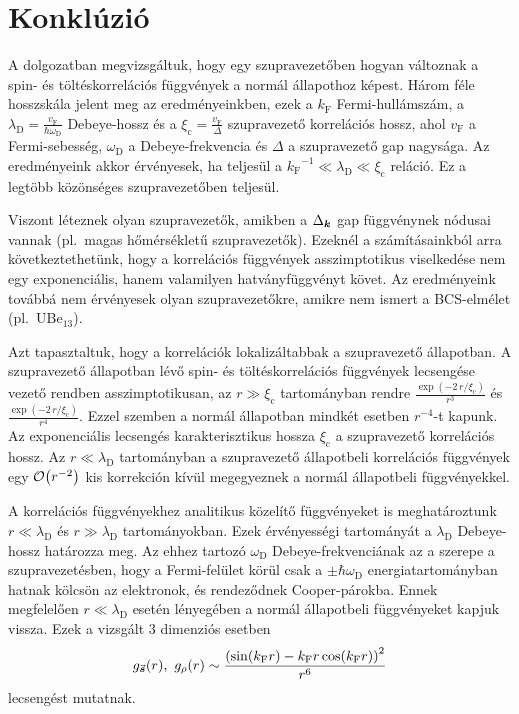 \documentclass[a4paper,12pt,titlepage]{article}
\newcommand{\KK}{{\vb*{k}}}
\newcommand{\kF}{{k_\text{F}}}
\newcommand{\vF}{{v_\text{F}}}
\begin{document}
\section{Konklúzió}

A dolgozatban megvizsgáltuk, hogy egy szupravezetőben hogyan változnak a spin- és töltéskorrelációs függvények a normál állapothoz képest.  Három féle hosszskála jelent meg az eredményeinkben, ezek a $\kF$ Fermi-hullámszám, a $\lambda_\text{D} = \frac{\vF}{\hbar \omega_\text{D}}$ Debeye-hossz és a $\xi_\text{c} = \frac{\vF}{\Delta}$ szupravezető korrelációs hossz, ahol $\vF$ a Fermi-sebesség, $\omega_\text{D}$ a Debeye-frekvencia és $\Delta$ a szupravezető gap nagysága.  Az eredményeink akkor érvényesek, ha teljesül a $\kF^{-1} \ll \lambda_\text{D} \ll \xi_\text{c}$ reláció.  Ez a legtöbb közönséges szupravezetőben teljesül.

Viszont léteznek olyan szupravezetők, amikben a $\Delta_\KK$ gap függvénynek nódusai vannak (pl.\ magas hőmérsékletű szupravezetők).  Ezeknél a számításainkból arra következtethetünk, hogy a korrelációs függvények asszimptotikus viselkedése nem egy exponenciális, hanem valamilyen hatványfüggvényt követ.  Az eredményeink továbbá nem érvényesek olyan szupravezetőkre, amikre nem ismert a BCS-elmélet (pl.\ $\mathrm{U}\mathrm{Be}_{13}$).

Azt tapasztaltuk, hogy a korrelációk lokalizáltabbak a szupravezető állapotban.  A szupravezető állapotban lévő spin- és töltéskorrelációs függvények lecsengése vezető rendben asszimptotikusan, az $r \gg \xi_\text{c}$ tartományban rendre $\frac{\exp(-2 \, r / \xi_\text{c})}{r^3}$ és $\frac{\exp(-2 \, r / \xi_\text{c})}{r^4}$.  Ezzel szemben a normál állapotban mindkét esetben $r^{-4}$-t kapunk.  Az exponenciális lecsengés karakterisztikus hossza $\xi_\text{c}$ a szupravezető korrelációs hossz.  Az $r \ll \lambda_\text{D}$ tartományban a szupravezető állapotbeli korrelációs függvények egy $\order{r^{-2}}$ kis korrekción kívül megegyeznek a normál állapotbeli függvényekkel.

A korrelációs függvényekhez analitikus közelítő függvényeket is meghatároztunk $r \ll \lambda_\text{D}$ és $r \gg \lambda_\text{D}$ tartományokban.  Ezek érvényességi tartományát a $\lambda_\text{D}$ Debeye-hossz határozza meg.  Az ehhez tartozó $\omega_\text{D}$ Debeye-frekvenciának az a szerepe a szupravezetésben, hogy a Fermi-felület körül csak a $\pm \hbar \omega_\text{D}$ energiatartományban hatnak kölcsön az elektronok, és rendeződnek Cooper-párokba.  Ennek megfelelően $r \ll \lambda_\text{D}$ esetén lényegében a normál állapotbeli függvényeket kapjuk vissza.  Ezek a vizsgált 3 dimenziós esetben
$$ g_{\va*{s}}(r), \ g_\rho(r) \sim \frac{\left( \sin(\kF r) - \kF r \cos(\kF r) \right)^2}{r^6} $$
lecsengést mutatnak.
\end{document}
